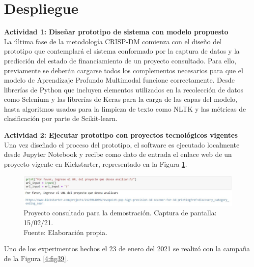 \section{Despliegue}
\textbf{Actividad 1: Diseñar prototipo de sistema con modelo propuesto}
\\
La última fase de la metodología CRISP-DM comienza con el diseño del prototipo que contemplará el sistema conformado por la captura de datos y la predicción del estado de financiamiento de un proyecto consultado. Para ello, previamente se deberán cargarse todos los complementos necesarios para que el modelo de Aprendizaje Profundo Multimodal funcione correctamente. Desde librerías de Python que incluyen elementos utilizados en la recolección de datos como Selenium y las librerías de Keras para la carga de las capas del modelo, hasta algoritmos usados para la limpieza de texto como NLTK y las métricas de clasificación por parte de Scikit-learn.

\textbf{Actividad 2: Ejecutar prototipo con proyectos tecnológicos vigentes}
\\
Una vez diseñado el proceso del prototipo, el software es ejecutado localmente desde Jupyter Notebook y recibe como dato de entrada el enlace web de un proyecto vigente en Kickstarter, representado en la Figura \ref{4:fig38}.

\begin{figure}[!ht]
	\begin{center}
		\includegraphics[width=1.10\textwidth]{4/figures/prototipo_input_project1.jpg}
		\caption[Proyecto consultado para la demostración. Captura de pantalla: 15/02/21]{Proyecto consultado para la demostración. Captura de pantalla: 15/02/21.\\
			Fuente: Elaboración propia.}
		\label{4:fig38}
	\end{center}
\end{figure}

Uno de los experimentos hechos el 23 de enero del 2021 se realizó con la campaña de la Figura \ref{4:fig39}.

